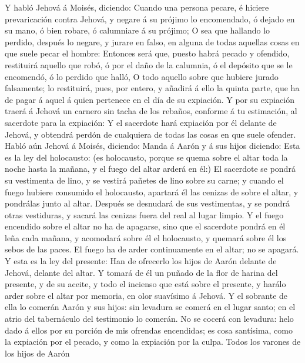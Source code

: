  Y habló Jehová á Moisés, diciendo:  Cuando una
persona pecare, é hiciere prevaricación contra Jehová, y negare á su
prójimo lo encomendado, ó dejado en su mano, ó bien robare, ó calumniare
á su prójimo;  O sea que hallando lo perdido, después lo
negare, y jurare en falso, en alguna de todas aquellas cosas en que
suele pecar el hombre:  Entonces será que, puesto habrá
pecado y ofendido, restituirá aquello que robó, ó por el daño de la
calumnia, ó el depósito que se le encomendó, ó lo perdido que halló,
 O todo aquello sobre que hubiere jurado falsamente; lo
restituirá, pues, por entero, y añadirá á ello la quinta parte, que ha
de pagar á aquel á quien pertenece en el día de su expiación.
 Y por su expiación traerá á Jehová un carnero sin tacha de
los rebaños, conforme á tu estimación, al sacerdote para la expiación:
 Y el sacerdote hará expiación por él delante de Jehová, y
obtendrá perdón de cualquiera de todas las cosas en que suele ofender.
 Habló aún Jehová á Moisés, diciendo:  Manda á
Aarón y á sus hijos diciendo: Esta es la ley del holocausto: (es
holocausto, porque se quema sobre el altar toda la noche hasta la
mañana, y el fuego del altar arderá en él:)  El sacerdote
se pondrá su vestimenta de lino, y se vestirá pañetes de lino sobre su
carne; y cuando el fuego hubiere consumido el holocausto, apartará él
las cenizas de sobre el altar, y pondrálas junto al altar. 
Después se desnudará de sus vestimentas, y se pondrá otras vestiduras, y
sacará las cenizas fuera del real al lugar limpio.  Y el
fuego encendido sobre el altar no ha de apagarse, sino que el sacerdote
pondrá en él leña cada mañana, y acomodará sobre él el holocausto, y
quemará sobre él los sebos de las paces.  El fuego ha de
arder continuamente en el altar; no se apagará.  Y esta es
la ley del presente: Han de ofrecerlo los hijos de Aarón delante de
Jehová, delante del altar.  Y tomará de él un puñado de la
flor de harina del presente, y de su aceite, y todo el incienso que está
sobre el presente, y harálo arder sobre el altar por memoria, en olor
suavísimo á Jehová.  Y el sobrante de ella lo comerán Aarón
y sus hijos: sin levadura se comerá en el lugar santo; en el atrio del
tabernáculo del testimonio lo comerán.  No se cocerá con
levadura: helo dado á ellos por su porción de mis ofrendas encendidas;
es cosa santísima, como la expiación por el pecado, y como la expiación
por la culpa.  Todos los varones de los hijos de Aarón
